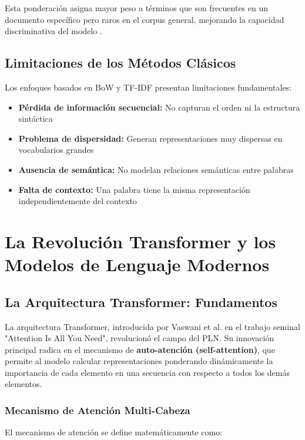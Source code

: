 Esta ponderación asigna mayor peso a términos que son frecuentes en un documento específico pero raros en el corpus general, mejorando la capacidad discriminativa del modelo \cite{thota2018fake}.

\subsection{Limitaciones de los Métodos Clásicos}

Los enfoques basados en BoW y TF-IDF presentan limitaciones fundamentales:
\begin{itemize}
    \item \textbf{Pérdida de información secuencial:} No capturan el orden ni la estructura sintáctica
    \item \textbf{Problema de dispersidad:} Generan representaciones muy dispersas en vocabularios grandes
    \item \textbf{Ausencia de semántica:} No modelan relaciones semánticas entre palabras
    \item \textbf{Falta de contexto:} Una palabra tiene la misma representación independientemente del contexto
\end{itemize}

\section{La Revolución Transformer y los Modelos de Lenguaje Modernos}
\label{sec:transformers_modelos_lenguaje}

\subsection{La Arquitectura Transformer: Fundamentos}

La arquitectura Transformer, introducida por Vaswani et al. \cite{vaswani2017attention} en el trabajo seminal "Attention Is All You Need", revolucionó el campo del PLN. Su innovación principal radica en el mecanismo de \textbf{auto-atención (self-attention)}, que permite al modelo calcular representaciones ponderando dinámicamente la importancia de cada elemento en una secuencia con respecto a todos los demás elementos.

\subsubsection{Mecanismo de Atención Multi-Cabeza}

El mecanismo de atención se define matemáticamente como:

